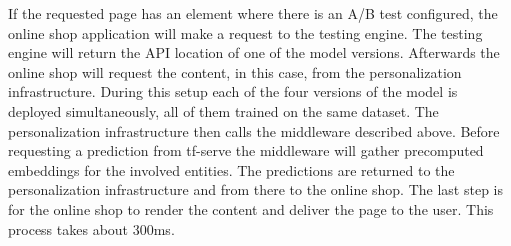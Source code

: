 If the requested page has an element where there is an A/B test configured, the online shop application will make a request to the testing engine.
The testing engine will return the API location of one of the model versions.
Afterwards the online shop will request the content, in this case, from the personalization infrastructure.
During this setup each of the four versions of the model is deployed simultaneously, all of them trained on the same dataset.
The personalization infrastructure then calls the middleware described above.
Before requesting a prediction from tf-serve the middleware will gather precomputed embeddings for the involved entities.
The predictions are returned to the personalization infrastructure and from there to the online shop.
The last step is for the online shop to render the content and deliver the page to the user.
This process takes about 300ms.